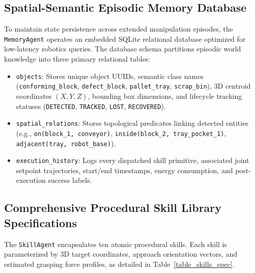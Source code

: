 \documentclass[journal]{IEEEtran}
\begin{document}
\subsection{Spatial-Semantic Episodic Memory Database}
To maintain state persistence across extended manipulation episodes, the \texttt{MemoryAgent} operates an embedded SQLite relational database optimized for low-latency robotics queries. The database schema partitions episodic world knowledge into three primary relational tables:
\begin{itemize}
    \item \texttt{objects}: Stores unique object UUIDs, semantic class names (\texttt{conforming\_block}, \texttt{defect\_block}, \texttt{pallet\_tray}, \texttt{scrap\_bin}), 3D centroid coordinates $(X, Y, Z)$, bounding box dimensions, and lifecycle tracking statuses (\texttt{DETECTED}, \texttt{TRACKED}, \texttt{LOST}, \texttt{RECOVERED}).
    \item \texttt{spatial\_relations}: Stores topological predicates linking detected entities (e.g., \texttt{on(block\_1, conveyor)}, \texttt{inside(block\_2, tray\_pocket\_1)}, \texttt{adjacent(tray, robot\_base)}).
    \item \texttt{execution\_history}: Logs every dispatched skill primitive, associated joint setpoint trajectories, start/end timestamps, energy consumption, and post-execution success labels.
\end{itemize}

\subsection{Comprehensive Procedural Skill Library Specifications}
The \texttt{SkillAgent} encapsulates ten atomic procedural skills. Each skill is parameterized by 3D target coordinates, approach orientation vectors, and estimated grasping force profiles, as detailed in Table~\ref{table_skills_spec}.
\end{document}
